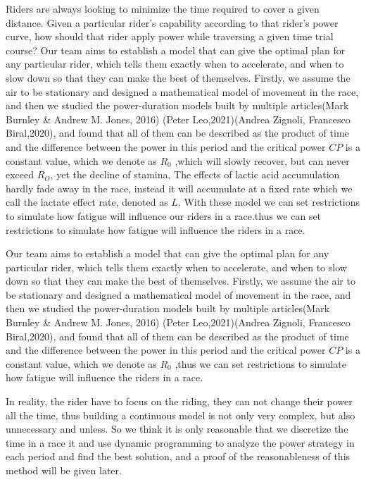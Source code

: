 \documentclass[12pt]{article}
\begin{document}
Riders are always looking to minimize the time required to cover a given distance. Given a
particular rider's capability according to that rider's power curve, how should that rider apply
power while traversing a given time trial course?
Our team aims to establish a model that can give the optimal plan for any particular rider, which tells them exactly when to accelerate,
and when to slow down so that they can make the best of themselves. Firstly, we assume the air to be stationary and designed a mathematical model of movement
in the race, and then we studied the power-duration models built by multiple articles(Mark Burnley \& Andrew M. Jones, 2016)\cite{doi:10.1080/17461391.2016.1249524}
(Peter Leo,2021)\cite{leo2021power}(Andrea Zignoli, Francesco Biral,2020)\cite{zignoli2020prediction}, and found that all of them can be described as the product of time and the difference
between the power in this period and the critical power $CP$ is a constant value, which we denote as $R_0$ ,which will slowly recover, but can never exceed $R_O$, yet the decline of stamina, The effects of lactic acid accumulation hardly fade away 
in the race, instead it will accumulate at a fixed rate which we call the lactate effect rate, denoted as $L$. With these model we can set restrictions  to simulate how fatigue will influence our riders in a race.thus we can  set restrictions
to simulate how fatigue will influence the riders in a race.

Our team aims to establish a model that can give the optimal plan for any particular rider, which tells them exactly when to accelerate, and when to slow down so that they can make the best of themselves. Firstly, we assume the air to be stationary and designed a mathematical model of movement in the race, and then we studied the power-duration models built by multiple articles(Mark Burnley \& Andrew M. Jones, 2016)\cite{doi:10.1080/17461391.2016.1249524} (Peter Leo,2021)\cite{leo2021power}(Andrea Zignoli, Francesco Biral,2020)\cite{zignoli2020prediction}, and found that all of them can be described as the product of time and the difference between the power in this period and the critical power $CP$ is a constant value, which we denote as $R_0$ ,thus we can  set restrictions  to simulate how fatigue will influence the riders in a race.

In reality, the rider have to focus on the riding, they can not change their power all the time, thus building a continuous model is not only very complex, but also unnecessary and unless. So we think it is only reasonable that we discretize the time in a race  it and use dynamic programming to analyze the power strategy in each period and find the best solution, and a proof of the reasonableness of this method will be given later.
\end{document}
